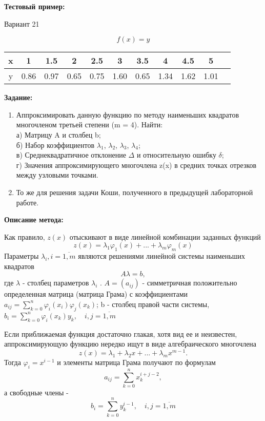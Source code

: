 \documentclass [12pt]{article}
\begin{document}
\textbf{Тестовый пример:}

Вариант 21

$$f(x) = y$$

\begin{table}[h]
\begin{center}
\begin{tabular}{|c|c|c|c|c|c|c|c|c|c|c|}
\hline
x & 1 & 1.5 & 2 & 2.5 & 3 & 3.5 & 4 & 4.5 & 5\\
\hline
y & 0.86 & 0.97 & 0.65 & 0.75 & 1.60 & 0.65 & 1.34 & 1.62 & 1.01\\
\hline
\end{tabular}
\end{center}
\end{table}

\textbf{Задание:}

\begin{enumerate}
    \item Аппроксимировать данную функцию по методу наименьших квадратов многочленом третьей степени (m = 4). Найти:\\
    а) Матрицу A и столбец b;\\
    б) Набор коэффициентов $\lambda_1$, $\lambda_2$, $\lambda_3$, $\lambda_4$;\\
    в) Среднеквадратичное отклонение $\Delta$ и относительную ошибку $\delta$;\\
    г) Значения аппроксимирующего многочлена z(x) в средних точках отрезков между узловыми точками.
    \item То же для решения задачи Коши, полученного в предыдущей лабораторной работе.
\end{enumerate}

\textbf{Описание метода:}

Как правило, $z(x)$ отыскивают в виде линейной комбинации заданных функций $$z(x) = \lambda_{1}\varphi_{1}(x) + ... + \lambda_m\varphi_m(x)$$
Параметры $\lambda_i, i = \overline{1,m}$ являются решениями линейной системы наименьших квадратов $$ A\lambda = b, $$
где $\lambda$ - столбец параметров $\lambda_i$ . $A = (a_{ij})$ - симметричная положительно определенная матрица (матрица Грама) с коэффициентами $ a_{ij} = \sum\limits_{k = 0}^n{\varphi_i(x_i)\varphi_j(x_k)}$; b - столбец правой части системы, $ b_i = \sum\limits_{k = 0}^n{\varphi_i(x_k)y_k}, \quad i,j = \overline{1,m} $


Если приближаемая функция достаточно глакая, хотя вид ее и неизвестен, аппроксимирующую функцию нередко ищут в виде алгебраического многочлена $$ z(x) = \lambda_{1} + \lambda_{2}x + ... + \lambda_{m}x^{m-1}.$$
Тогда $\varphi_i = x^{i-1}$ и элементы матрица Грама получают по формулам $$ a_{ij} = \sum\limits_{k = 0}^n{x_{k}^{i + j - 2}},$$
а свободные члены - $$b_i = \sum\limits_{k = 0}^n{y_{k}^{i - 1}}, \quad i, j = \overline{1,m} $$
\end{document}
